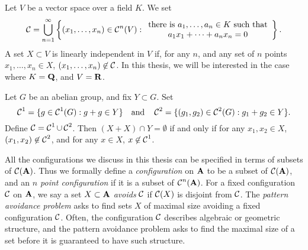 \begin{example}
	Let $V$ be a vector space over a field $K$. We set
	\[ \operatorname{\mathcal{C}} = \bigcup_{n = 1}^\infty \left\{ (x_1, \dots, x_n) \in \operatorname{\mathcal{C}}^n(V): \begin{array}{c}
			\text{there is $a_1, \dots, a_n \in K$ such that}\\
			\text{$a_1x_1 + \dots + a_nx_n = 0$}
		\end{array} \right\}. \]
	A set $X \subset V$ is linearly independent in $V$ if, for any $n$, and any set of $n$ points $x_1, \dots, x_n \in X$, $(x_1, \dots, x_n) \not \in \operatorname{\mathcal{C}}$. In this thesis, we will be interested in the case where $K = \operatorname{\mathbf{Q}}$, and $V = \operatorname{\mathbf{R}}$.
\end{example}

\begin{example}
	Let $G$ be an abelian group, and fix $Y \subset G$. Set
	\[ \operatorname{\mathcal{C}}^1 = \{ g \in \operatorname{\mathcal{C}}^1(G): g + g \in Y \} \quad \text{and} \quad \operatorname{\mathcal{C}}^2 = \{ (g_1,g_2) \in \operatorname{\mathcal{C}}^2(G): g_1 + g_2 \in Y \}. \]
	Define $\operatorname{\mathcal{C}} = \operatorname{\mathcal{C}}^1 \cup \operatorname{\mathcal{C}}^2$. Then $(X + X) \cap Y = \emptyset$ if and only if for any $x_1,x_2 \in X$, $(x_1,x_2) \not \in \operatorname{\mathcal{C}}^2$, and for any $x \in X$, $x \not \in \operatorname{\mathcal{C}}^1$.
\end{example}

All the configurations we discuss in this thesis can be specified in terms of subsets of $\operatorname{\mathcal{C}}(\operatorname{\mathbf{A}})$. Thus we formally define a \emph{configuration} on $\operatorname{\mathbf{A}}$ to be a subset of $\operatorname{\mathcal{C}}(\operatorname{\mathbf{A}})$, and an \emph{$n$ point configuration} if it is a subset of $\operatorname{\mathcal{C}}^n(\operatorname{\mathbf{A}})$. For a fixed configuration $\operatorname{\mathcal{C}}$ on $\operatorname{\mathbf{A}}$, we say a set $X \subset \operatorname{\mathbf{A}}$ \emph{avoids} $\operatorname{\mathcal{C}}$ if $\operatorname{\mathcal{C}}(X)$ is disjoint from $\operatorname{\mathcal{C}}$. The \emph{pattern avoidance problem} asks to find sets $X$ of maximal size avoiding a fixed configuration $\operatorname{\mathcal{C}}$. Often, the configuration $\operatorname{\mathcal{C}}$ describes algebraic or geometric structure, and the pattern avoidance problem asks to find the maximal size of a set before it is guaranteed to have such structure.


